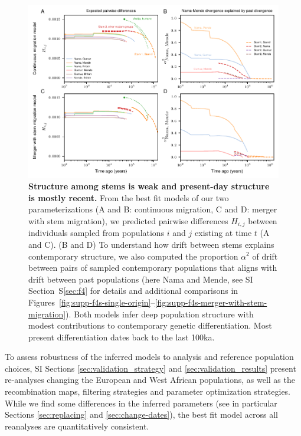 \documentclass[]{article}
\begin{document}
\begin{figure}[t!]
    \centering
    \includegraphics{figures/predictions.pdf}
    \caption{
        \textbf{Structure among stems is weak and present-day structure is mostly recent.}
        From the best fit models of our two parameterizations (A and B:
        continuous migration, C and D: merger with stem migration),
        we predicted pairwise differences $H_{i,j}$ between individuals
        sampled from populations $i$ and $j$ existing at time $t$ (A and C).
        (B and D) To understand how drift between stems explains contemporary structure, 
        we also computed the proportion $\alpha^2$ of drift between pairs of
        sampled contemporary
        populations that aligns with drift between past populations
        (here Nama and Mende, see SI Section~S\ref{sec:f4}
        for details and additional comparisons in
        Figures~\ref{fig:supp-f4s-single-origin}--\ref{fig:supp-f4s-merger-with-stem-migration}).
        Both models infer deep population structure with modest contributions to
        contemporary genetic differentiation.
        Most present differentiation dates back to the last 100ka.
    }
    \label{fig:predictions}
\end{figure}

To assess robustness of the inferred models to analysis and reference
population choices, SI Sections \ref{sec:validation_strategy}
and \ref{sec:validation_results} present re-analyses changing the European and
West African populations, as well as the recombination maps, filtering
strategies and parameter optimization strategies. While we find some
differences in the inferred parameters (see in particular Sections
\ref{sec:replacing} and \ref{sec:change-dates}), the best fit model across all
reanalyses are quantitatively consistent. 
\end{document}
